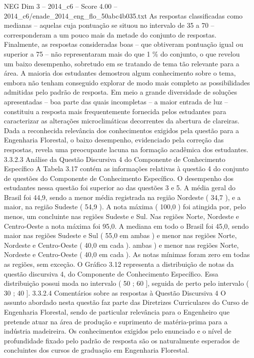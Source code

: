 \begin{textsample}{NEG Dim 3 – 2014\_c6 – Score 4.00 – 2014\_c6/enade\_2014\_eng\_flo\_50abc4b035.txt}
As respostas classificadas como medianas – aquelas cuja pontuação se situou no intervalo de 35 a 70 – corresponderam a um pouco mais da metade do conjunto de respostas.
Finalmente, as respostas consideradas boas – que obtiveram pontuação igual ou superior a 75 – não representaram mais do que 1 \% do conjunto, o que revelou um baixo desempenho, sobretudo em se tratando de tema tão relevante para a área.
A maioria dos estudantes demostrou algum conhecimento sobre o tema, embora não tenham conseguido explorar de modo mais completo as possibilidades admitidas pelo padrão de resposta.
Em meio a grande diversidade de soluções apresentadas – boa parte das quais incompletas – a maior entrada de luz – constituiu a resposta mais frequentemente fornecida pelos estudantes para caracterizar as alterações microclimáticas decorrentes da abertura de clareiras.
Dada a reconhecida relevância dos conhecimentos exigidos pela questão para a Engenharia Florestal, o baixo desempenho, evidenciado pela correção das respostas, revela uma preocupante lacuna na formação acadêmica dos estudantes. 3.3.2.3 Análise da Questão Discursiva 4 do Componente de Conhecimento Específico A Tabela 3.17 contém as informações relativas à questão 4 do conjunto de questões do Componente de Conhecimento Específico.
O desempenho dos estudantes nessa questão foi superior ao das questões 3 e 5.
A média geral do Brasil foi 44,9, sendo a menor média registrada na região Nordeste ( 34,7 ), e a maior, na região Sudeste ( 54,9 ).
A nota máxima ( 100,0 ) foi atingida por, pelo menos, um concluinte nas regiões Sudeste e Sul.
Nas regiões Norte, Nordeste e Centro-Oeste a nota máxima foi 95,0.
A mediana em todo o Brasil foi 45,0, sendo maior nas regiões Sudeste e Sul ( 55,0 em ambas ) e menor nas regiões Norte, Nordeste e Centro-Oeste ( 40,0 em cada ). ambas ) e menor nas regiões Norte, Nordeste e Centro-Oeste ( 40,0 em cada ).
As notas mínimas foram zero em todas as regiões, sem exceção.
O Gráfico 3.12 representa a distribuição de notas da questão discursiva 4, do Componente de Conhecimento Específico.
Essa distribuição possui moda no intervalo ( 50 ; 60 ], seguida de perto pelo intervalo ( 30 ; 40 ]. 3.3.2.4 Comentários sobre as respostas à Questão Discursiva 4 O assunto abordado nesta questão faz parte das Diretrizes Curriculares do Curso de Engenharia Florestal, sendo de particular relevância para o Engenheiro que pretende atuar na área de produção e suprimento de matéria-prima para a indústria madeireira.
Os conhecimentos exigidos pelo enunciado e o nível de profundidade fixado pelo padrão de resposta são os naturalmente esperados de concluintes dos cursos de graduação em Engenharia Florestal.

\end{textsample}
